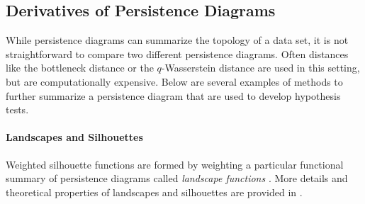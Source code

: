 \documentclass[12pt]{article}
\newcommand{\brittany}[1]{{\color{cyan} Brittany says: #1}}
\newcommand{\figref}[1]{Figure~\ref{#1}}
\def\R{{\mathbb R}}
\begin{document}
%

\subsection{Derivatives of Persistence Diagrams}
While persistence diagrams can summarize the topology of a data set, it is not straightforward to compare two different persistence diagrams. Often distances like the bottleneck distance or the $q$-Wasserstein distance are used in this setting, but are computationally expensive. Below are several examples of methods to further summarize a persistence diagram that are used to develop hypothesis tests.

\paragraph{Landscapes and Silhouettes}
Weighted silhouette functions are formed by weighting a particular functional summary of persistence diagrams called \emph{landscape functions} \citep{bubenik2015statistical}. More details and theoretical properties of landscapes and silhouettes are provided in \citep{chazal2014stochastic}.
\end{document}
